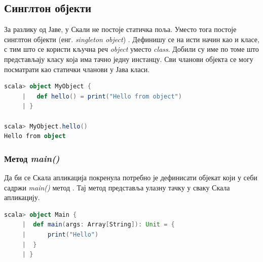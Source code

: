 \documentclass[12pt,oneside]{memoir}
\begin{document}
\subsection{Синглтон објекти}
\label{subsec:scala_sing_obj}

За разлику од Јаве, у Скали не постоје статичка поља. Уместо тога постоје синглтон објекти (енг. \textit{singleton object}) \cite{scala_prog}. Дефинишу се на исти начин као и класе, с тим што се користи кључна реч \textit{object} уместо \textit{class}. Добили су име по томе што представљају класу која има тачно једну инстанцу. Сви чланови објекта се могу посматрати као статички чланови у Јава класи.

\begin{lstlisting}[language=Scala, caption={Коришћење синглтон објекта}, label={lst:scala_oop_object_example}]
scala> object MyObject {
     |   def hello() = print("Hello from object")
     | }

scala> MyObject.hello()
Hello from object
\end{lstlisting}

%
%
%
%
%

\subsubsection{Метод \textit{main()}}
\label{subsubsec:scala_oop_main_app}

Да би се Скала апликација покренула потребно је дефинисати објекат који у себи садржи \textit{main()} метод \cite{scala_prog}. Тај метод представља улазну тачку у сваку Скала апликацију.

\begin{lstlisting}[language=Scala, caption={Пример метода \textit{main}}, label={lst:scala_oop_main_method}]
scala> object Main {
     |  def main(args: Array[String]): Unit = {
     |      print("Hello")
     | 	}
     | }
\end{lstlisting}
\end{document}

